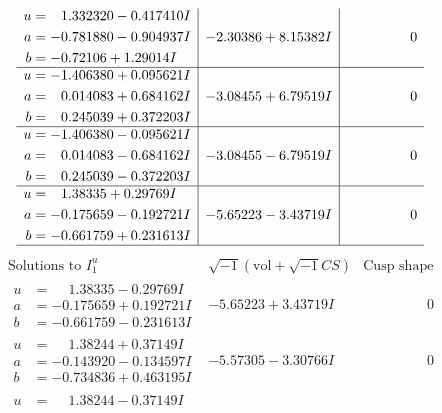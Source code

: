 \documentclass[1p]{elsarticle_modified}
\theoremstyle{definition}
\newcommand{\I}{\sqrt{-1}}
\begin{document}
$$\begin{array}{c|c|c}
\begin{aligned}
u &= \phantom{-}1.332320 - 0.417410 I \\
a &= -0.781880 - 0.904937 I \\
b &= -0.72106 + 1.29014 I\end{aligned}
 & -2.30386 + 8.15382 I & \phantom{-0.000000 } 0 \\ \hline\begin{aligned}
u &= -1.406380 + 0.095621 I \\
a &= \phantom{-}0.014083 + 0.684162 I \\
b &= \phantom{-}0.245039 + 0.372203 I\end{aligned}
 & -3.08455 + 6.79519 I & \phantom{-0.000000 } 0 \\ \hline\begin{aligned}
u &= -1.406380 - 0.095621 I \\
a &= \phantom{-}0.014083 - 0.684162 I \\
b &= \phantom{-}0.245039 - 0.372203 I\end{aligned}
 & -3.08455 - 6.79519 I & \phantom{-0.000000 } 0 \\ \hline\begin{aligned}
u &= \phantom{-}1.38335 + 0.29769 I \\
a &= -0.175659 - 0.192721 I \\
b &= -0.661759 + 0.231613 I\end{aligned}
 & -5.65223 - 3.43719 I & \phantom{-0.000000 } 0\\
 \hline 
 \end{array}$$\newpage$$\begin{array}{c|c|c}  
\text{Solutions to }I^u_{1}& \I (\text{vol} + \sqrt{-1}CS) & \text{Cusp shape}\\
 \hline 
\begin{aligned}
u &= \phantom{-}1.38335 - 0.29769 I \\
a &= -0.175659 + 0.192721 I \\
b &= -0.661759 - 0.231613 I\end{aligned}
 & -5.65223 + 3.43719 I & \phantom{-0.000000 } 0 \\ \hline\begin{aligned}
u &= \phantom{-}1.38244 + 0.37149 I \\
a &= -0.143920 - 0.134597 I \\
b &= -0.734836 + 0.463195 I\end{aligned}
 & -5.57305 - 3.30766 I & \phantom{-0.000000 } 0 \\ \hline\begin{aligned}
u &= \phantom{-}1.38244 - 0.37149 I \\

\end{aligned}
\end{array}$$
\end{document}
